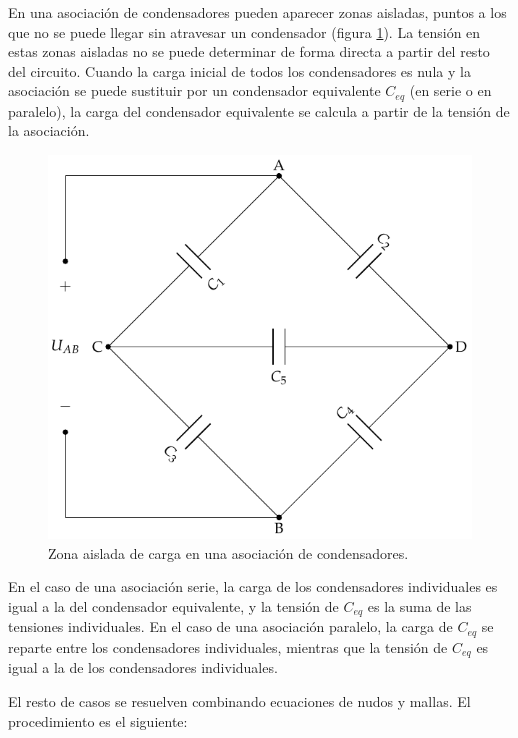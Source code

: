 En una asociación de condensadores pueden aparecer zonas aisladas,
puntos a los que no se puede llegar sin atravesar un condensador
(figura \ref{fig:zona-aislada}). La tensión en estas zonas aisladas no
se puede determinar de forma directa a partir del resto del
circuito. Cuando la carga inicial de todos los condensadores es nula y
la asociación se puede sustituir por un condensador equivalente
\(C_{eq}\) (en serie o en paralelo), la carga del condensador
equivalente se calcula a partir de la tensión de la asociación.

\begin{figure}
  \centering
  \includegraphics[height=0.25\textheight]{../figs/CondensadoresZonaAislada.pdf}
  \caption{Zona aislada de carga en una asociación de condensadores.}
  \label{fig:zona-aislada}
\end{figure}

En el caso de una asociación serie, la carga de los condensadores
individuales es igual a la del condensador equivalente, y la tensión
de \(C_{eq}\) es la suma de las tensiones individuales. En el caso de
una asociación paralelo, la carga de \(C_{eq}\) se reparte entre los
condensadores individuales, mientras que la tensión de \(C_{eq}\) es
igual a la de los condensadores individuales.

El resto de casos se resuelven combinando ecuaciones de nudos y
mallas. El procedimiento es el siguiente:

